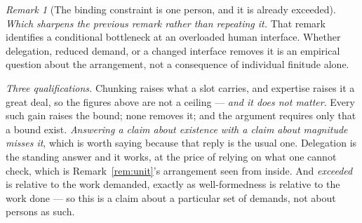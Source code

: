 \documentclass[11pt,a4paper]{article}
\theoremstyle{remark}
\newtheorem{remark}[definition]{Remark}
\begin{document}
\begin{remark}[The binding constraint is one person, and it is already exceeded]
\emph{Which sharpens the previous remark rather than repeating it.} That remark identifies a conditional bottleneck at an overloaded human interface. Whether delegation, reduced demand, or a changed interface removes it is an empirical question about the arrangement, not a consequence of individual finitude alone.

\emph{Three qualifications.} Chunking raises what a slot carries, and expertise raises it a
great deal, so the figures above are not a ceiling --- \emph{and it does not matter}. Every such gain
raises the bound; none removes it; and the argument requires only that a bound exist. \emph{Answering a
claim about existence with a claim about magnitude misses it}, which is worth saying because that reply
is the usual one. Delegation is the standing answer and it works, at the price of relying on what one
cannot check, which is Remark~\ref{rem:unit}'s arrangement seen from inside. And \emph{exceeded} is
relative to the work demanded, exactly as well-formedness is relative to the work done --- so this is a
claim about a particular set of demands, not about persons as such.
\end{remark}
\end{document}
